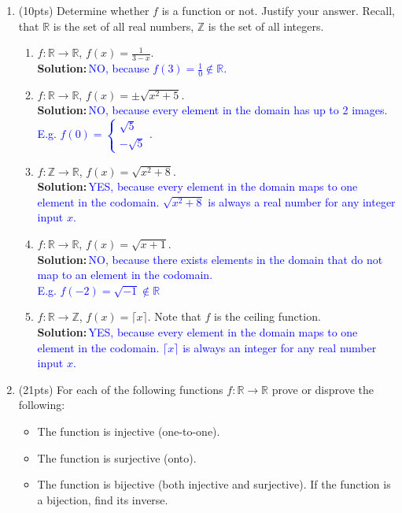 \documentclass{article}
\newcommand{\sol}[1]{\textbf{Solution:\,}\textcolor{blue}{#1}}
\begin{document}
\begin{enumerate}
\newpage

\item(10pts) Determine whether $f$ is a function or not. Justify your answer. Recall, that $\mathbb{R}$ is the set of all real numbers, $\mathbb{Z}$ is the set of all integers. 

\begin{enumerate}
\item $f:\mathbb{R} \rightarrow \mathbb{R}$, $f(x)=\frac{1}{3-x}$.
\\\sol{NO, because $f(3)=\frac{1}{0}\not\in\mathbb{R}$.
}
\item $f:\mathbb{R} \rightarrow \mathbb{R}$, $f(x)=\pm \sqrt{x^2+5}$.
\\\sol{NO, because every element in the domain has up to 2 images.
\\E.g. $f(0)=\begin{cases}\sqrt{5}\\-\sqrt{5}\end{cases}$.
}
\item $f:\mathbb{Z} \rightarrow \mathbb{R}$, $f(x)=\sqrt{x^2+8}$.
\\\sol{YES, because every element in the domain maps to one element in the codomain. $\sqrt{x^2+8}$ is always a real number for any integer input $x$.
}
\item $f:\mathbb{R} \rightarrow \mathbb{R}$, $f(x)=\sqrt{x+1}$.
\\\sol{NO, because there exists elements in the domain that do not map to an element in the codomain.
\\E.g. $f(-2)=\sqrt{-1}\not\in\mathbb{R}$
}
\item $f:\mathbb{R} \rightarrow \mathbb{Z}$, $f(x)=\lceil x \rceil$. Note that $f$ is the ceiling function.
\\\sol{YES, because every element in the domain maps to one element in the codomain. $\lceil x \rceil$ is always an integer for any real number input $x$.
}
\end{enumerate}

\newpage

\item(21pts) For each of the following functions $f:\mathbb{R} \rightarrow \mathbb{R}$ prove or disprove the following:
\begin{itemize}
\item The function is injective (one-to-one).
\item The function is surjective (onto).
\item The function is bijective (both injective and surjective). If the function is a bijection, find its inverse.
\end{itemize}


\end{enumerate}
\end{document}
